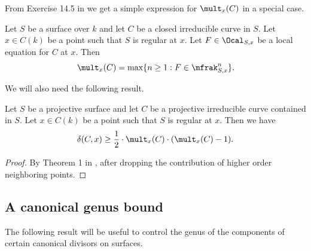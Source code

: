 From Exercise 14.5 in \cite{Matsumura} we get a simple expression for $\mult_x(C)$ in a special case.

\begin{lemma}
\notready\label{LemmaMultFormula} Let $S$ be a surface over $k$ and let $C$ be a closed irreducible curve in $S$. Let $x\in C(k)$ be a point such that $S$ is regular at $x$. Let $F\in \Ocal_{S,x}$ be a local equation for $C$ at $x$. Then
$$
\mult_x(C)=\max\{n\ge 1 : F\in \mfrak_{S,x}^n\}.
$$
\end{lemma}

We will also need the following result.
\begin{lemma}[Hironaka]
\notready \label{LemmaHironakaMult} Let $S$ be a projective surface and let $C$ be a projective irreducible curve contained in $S$. Let $x\in C(k)$ be a point such that $S$ is regular at $x$. Then we have
$$
\delta(C,x)\ge \frac{1}{2}\cdot \mult_x(C)\cdot (\mult_x(C)-1).
$$
\end{lemma}
\begin{proof} By Theorem 1 in \cite{Hironaka}, after dropping the contribution of higher order neighboring points.
\end{proof}

\subsection{A canonical genus bound}

The following result will be useful to control the genus of the components of certain canonical divisors on surfaces.

